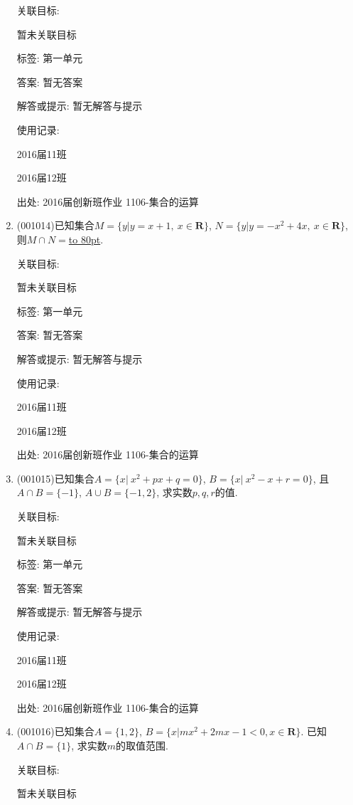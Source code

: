 \documentclass[10pt,a4paper]{article}
\newcommand{\blank}[1]{\underline{\hbox to #1pt{}}}
\begin{document}
\begin{enumerate}[1.]
关联目标:

暂未关联目标



标签: 第一单元

答案: 暂无答案

解答或提示: 暂无解答与提示

使用记录:

2016届11班	

2016届12班	


出处: 2016届创新班作业	1106-集合的运算
\item { (001014)}已知集合$M=\{y|y=x+1, \ x \in \mathbf{R}\}$, $N=\{y|y=-x^2+4x,\  x \in \mathbf{R}\}$,
则$M \cap N=$\blank{80}.


关联目标:

暂未关联目标



标签: 第一单元

答案: 暂无答案

解答或提示: 暂无解答与提示

使用记录:

2016届11班	

2016届12班	


出处: 2016届创新班作业	1106-集合的运算
\item { (001015)}已知集合$A=\{x|\ x^2+px+q=0\}$, $B=\{x|\ x^2-x+r=0\}$, 且$A\cap B=\{-1\}$, $A\cup B=\{-1,2\}$, 求实数$p,q,r$的值.


关联目标:

暂未关联目标



标签: 第一单元

答案: 暂无答案

解答或提示: 暂无解答与提示

使用记录:

2016届11班	

2016届12班	


出处: 2016届创新班作业	1106-集合的运算
\item { (001016)}已知集合$A=\{1,2\}$, $B=\{x|mx^2+2mx-1<0, x \in\mathbf{R}\}$. 已知$A \cap B=\{1\}$, 求实数$m$的取值范围.


关联目标:

暂未关联目标




\end{enumerate}
\end{document}
